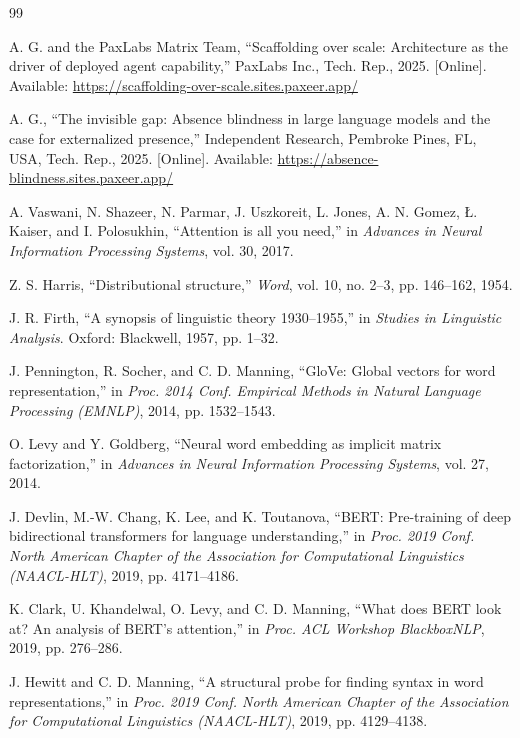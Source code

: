 \documentclass[conference]{IEEEtran}
\theoremstyle{definition}
\begin{document}
\begin{thebibliography}{99}

A. G. and the PaxLabs Matrix Team, ``Scaffolding over scale: Architecture as the driver of deployed agent capability,'' PaxLabs Inc., Tech. Rep., 2025. [Online]. Available: \url{https://scaffolding-over-scale.sites.paxeer.app/}

A. G., ``The invisible gap: Absence blindness in large language models and the case for externalized presence,'' Independent Research, Pembroke Pines, FL, USA, Tech. Rep., 2025. [Online]. Available: \url{https://absence-blindness.sites.paxeer.app/}

A. Vaswani, N. Shazeer, N. Parmar, J. Uszkoreit, L. Jones, A. N. Gomez, {\L}. Kaiser, and I. Polosukhin, ``Attention is all you need,'' in \emph{Advances in Neural Information Processing Systems}, vol. 30, 2017.

Z. S. Harris, ``Distributional structure,'' \emph{Word}, vol. 10, no. 2--3, pp. 146--162, 1954.

J. R. Firth, ``A synopsis of linguistic theory 1930--1955,'' in \emph{Studies in Linguistic Analysis}. Oxford: Blackwell, 1957, pp. 1--32.

J. Pennington, R. Socher, and C. D. Manning, ``GloVe: Global vectors for word representation,'' in \emph{Proc. 2014 Conf. Empirical Methods in Natural Language Processing (EMNLP)}, 2014, pp. 1532--1543.

O. Levy and Y. Goldberg, ``Neural word embedding as implicit matrix factorization,'' in \emph{Advances in Neural Information Processing Systems}, vol. 27, 2014.

J. Devlin, M.-W. Chang, K. Lee, and K. Toutanova, ``BERT: Pre-training of deep bidirectional transformers for language understanding,'' in \emph{Proc. 2019 Conf. North American Chapter of the Association for Computational Linguistics (NAACL-HLT)}, 2019, pp. 4171--4186.

K. Clark, U. Khandelwal, O. Levy, and C. D. Manning, ``What does BERT look at? An analysis of BERT's attention,'' in \emph{Proc. ACL Workshop BlackboxNLP}, 2019, pp. 276--286.

J. Hewitt and C. D. Manning, ``A structural probe for finding syntax in word representations,'' in \emph{Proc. 2019 Conf. North American Chapter of the Association for Computational Linguistics (NAACL-HLT)}, 2019, pp. 4129--4138.


\end{thebibliography}
\end{document}
